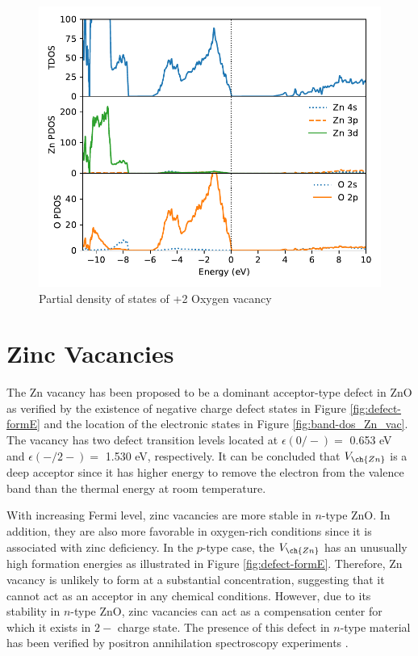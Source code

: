 \begin{figure}[tbh!]
	\centering
	\includegraphics[width=0.6\linewidth]{"images/rnd/dos-pdos_O_vac-p2"}
	\caption[Partial density of states of +2 Oxygen vacancy]{Partial density of states of +2 Oxygen vacancy}
	\label{fig:dos-pdos_O_vac-p2}
\end{figure}

\clearpage


\section{Zinc Vacancies}
The Zn vacancy has been proposed to be a dominant acceptor-type defect in ZnO as verified by the existence of negative charge defect states in Figure \ref{fig:defect-formE} and the location of the electronic states in Figure \ref{fig:band-dos_Zn_vac}. The  vacancy has two defect transition levels located at 
 $\epsilon(0/-)=$ 0.653 eV and  $\epsilon(-/2-)=$ 1.530 eV, respectively. It can be concluded that $V_{\ch{Zn}}$  is a deep acceptor since it has higher energy to remove the electron from the valence band than the thermal energy at room temperature.  	

 With increasing Fermi level, zinc vacancies are more stable  in $n$-type ZnO. In addition, they are also more favorable in oxygen-rich conditions since it is associated with zinc deficiency. In the $p$-type case, the $V_{\ch{Zn}}$ has an unusually high formation energies as illustrated in Figure \ref{fig:defect-formE}. Therefore,  Zn vacancy is unlikely to form at a substantial concentration, suggesting that it cannot act as an acceptor in any chemical conditions. However, due to its stability in $n$-type ZnO, zinc vacancies can act as a compensation center for which it exists in $2-$ charge state. The presence of this defect in $n$-type material has been verified by positron annihilation spectroscopy experiments \citep{Tuomisto2003,Tuomisto2005}. 


